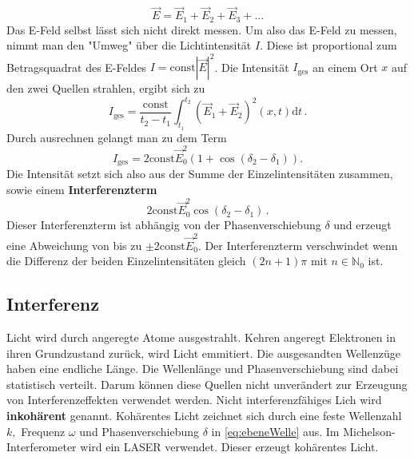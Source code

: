 \begin{equation*}
    \vec{E} = \vec{E}_1 + \vec{E}_2 + \vec{E}_3 + ...
\end{equation*}
Das E-Feld selbst lässt sich nicht direkt messen.
Um also das E-Feld zu messen, nimmt man den "Umweg" über die Lichtintensität $I$.
Diese ist proportional zum Betragsquadrat des E-Feldes $I = \text{const} |\vec{E}|^2$.
Die Intensität $I_{\text{ges}}$ an einem Ort $x$ auf den zwei Quellen strahlen,
ergibt sich zu 
\begin{equation*}
    I_{\text{ges}} = \frac{\text{const}}{t_2 - t_1} \int_{t_1}^{t_2} \left( \vec{E}_1 + \vec{E}_2 \right)^2 \left(x,t\right) \text{d}t\, .
\end{equation*}
Durch ausrechnen gelangt man zu dem Term
\begin{equation}\label{eq:Intensitaet}
    I_{\text{ges}} = 2\text{const}\vec{E}_0^2\left(1 + \cos{(δ_2-δ_1)}\right).
\end{equation}
Die Intensität setzt sich also aus der Summe der Einzelintensitäten zusammen,
sowie einem \textbf{Interferenzterm}
\begin{equation*}
    2\text{const}\vec{E}_0^2\cos{(δ_2-δ_1)}\, .
\end{equation*}
Dieser Interferenzterm ist abhängig von der Phasenverschiebung $δ$ und erzeugt eine Abweichung von bis zu $\pm 2\text{const}\vec{E}_0^2.$ 
Der Interferenzterm verschwindet wenn die Differenz der beiden Einzelintensitäten gleich $(2n + 1)π$ mit $n \in \mathbb{N}_0$ ist.

\subsection{Interferenz}
\label{sec:Interferenz}

Licht wird durch angeregte Atome ausgestrahlt. 
Kehren angeregt Elektronen in ihren Grundzustand zurück, wird Licht emmitiert.
Die ausgesandten Wellenzüge haben eine endliche Länge.
Die Wellenlänge und Phasenverschiebung sind dabei statistisch verteilt.
Darum können diese Quellen nicht unverändert zur Erzeugung von Interferenzeffekten verwendet werden.
Nicht interferenzfähiges Lich wird \textbf{inkohärent} genannt.
Kohärentes Licht zeichnet sich durch eine feste Wellenzahl $k,$ Frequenz $ω$ und Phasenverschiebung $δ$ in \autoref{eq:ebeneWelle} aus.
Im Michelson-Interferometer wird ein LASER verwendet.
Dieser erzeugt kohärentes Licht.

